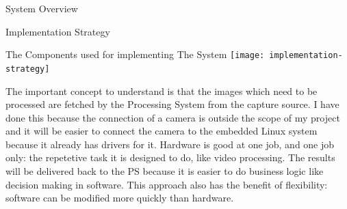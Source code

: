 \documentclass{matthijs}
\begin{document}
\begin{hoofdstuk}{System Overview}
\begin{paragraaf}{Implementation Strategy}
			\vspace{-0.6ex}
			\begin{figuur}{The Components used for implementing The System}
				\singlespacing
				\texttt{[image: implementation-strategy]}
				\onehalfspacing
			\end{figuur}
			\vspace{-0.2ex}

			The important concept to understand is that the images which need to be processed are fetched by the Processing System from the capture source.
			I have done this because the connection of a camera is outside the scope of my project and it will be easier to connect the camera to the embedded Linux system because it already has drivers for it.
			Hardware is good at one job, and one job only: the repetetive task it is designed to do, like video processing.
			The results will be delivered back to the PS because it is easier to do business logic like decision making in software.
			This approach also has the benefit of flexibility: software can be modified more quickly than hardware.


		\end{paragraaf}

	\end{hoofdstuk}
\end{document}
